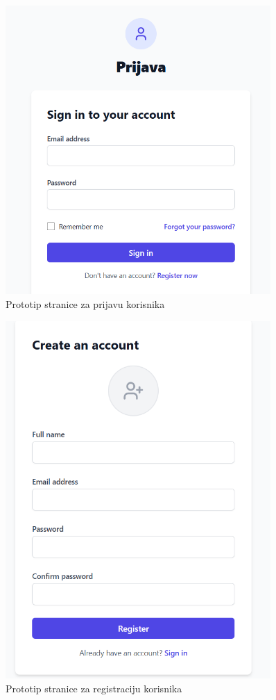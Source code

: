 \begin{figure}[H]
    \centering
    \includegraphics[width=0.9\textwidth]{Slike/fz3.3.png}
    \caption{Prototip stranice za prijavu korisnika}
    \label{fig:fz3.3}
\end{figure}

\begin{figure}[H]
    \centering
    \includegraphics[width=0.9\textwidth]{Slike/fz3.4.png}
    \caption{Prototip stranice za registraciju korisnika}
    \label{fig:fz3.4}
\end{figure}

